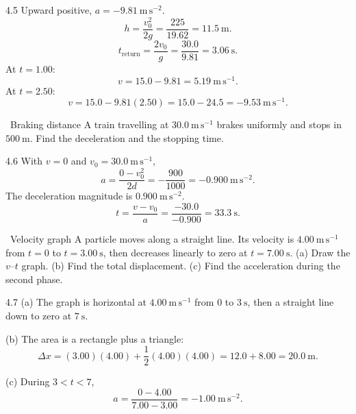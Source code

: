 \begin{tabletworkspace}[6.5cm]
\end{tabletworkspace}

\begin{solution}{4.5}
Upward positive, $a=-9.81\ \mathrm{m\,s^{-2}}$.
\[
h=\frac{v_0^2}{2g}=\frac{225}{19.62}=11.5\ \mathrm{m}.
\]
\[
t_{\mathrm{return}}=\frac{2v_0}{g}=\frac{30.0}{9.81}=3.06\ \mathrm{s}.
\]
At $t=1.00$:
\[
v=15.0-9.81=5.19\ \mathrm{m\,s^{-1}}.
\]
At $t=2.50$:
\[
v=15.0-9.81(2.50)=15.0-24.5=-9.53\ \mathrm{m\,s^{-1}}.
\]
\end{solution}

\begin{exercise}{\core\ Braking distance}
A train travelling at $30.0\ \mathrm{m\,s^{-1}}$ brakes uniformly and stops in
$500\ \mathrm{m}$. Find the deceleration and the stopping time.
\end{exercise}

\begin{tabletworkspace}[6.5cm]
\end{tabletworkspace}

\begin{solution}{4.6}
With $v=0$ and $v_0=30.0\ \mathrm{m\,s^{-1}}$,
\[
a=\frac{0-v_0^2}{2d}=-\frac{900}{1000}=-0.900\ \mathrm{m\,s^{-2}}.
\]
The deceleration magnitude is $0.900\ \mathrm{m\,s^{-2}}$.
\[
t=\frac{v-v_0}{a}=\frac{-30.0}{-0.900}=33.3\ \mathrm{s}.
\]
\end{solution}

\begin{exercise}{\core\ Velocity graph}
A particle moves along a straight line. Its velocity is
$4.00\ \mathrm{m\,s^{-1}}$ from $t=0$ to $t=3.00\ \mathrm{s}$, then decreases
linearly to zero at $t=7.00\ \mathrm{s}$.
(a) Draw the $v$--$t$ graph.
(b) Find the total displacement.
(c) Find the acceleration during the second phase.
\end{exercise}

\begin{tabletworkspace}[6.5cm]
\end{tabletworkspace}

\begin{solution}{4.7}
(a) The graph is horizontal at $4.00\ \mathrm{m\,s^{-1}}$ from $0$ to $3\ \mathrm{s}$,
then a straight line down to zero at $7\ \mathrm{s}$.

(b) The area is a rectangle plus a triangle:
\[
\Delta x=(3.00)(4.00)+\frac12(4.00)(4.00)=12.0+8.00=20.0\ \mathrm{m}.
\]

(c) During $3<t<7$,
\[
a=\frac{0-4.00}{7.00-3.00}=-1.00\ \mathrm{m\,s^{-2}}.
\]
\end{solution}

